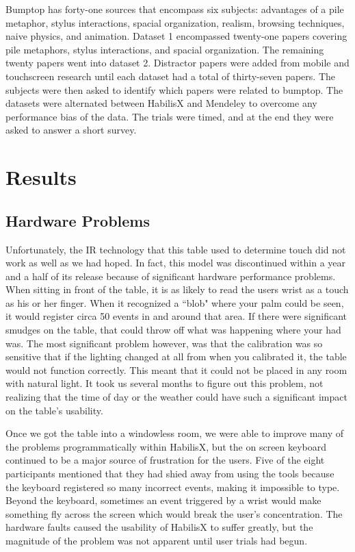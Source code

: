 \documentclass{article}
\begin{document}
	Bumptop has forty-one sources that encompass six subjects: advantages of a pile metaphor, stylus interactions, spacial organization, realism, browsing techniques, naive physics, and animation.  Dataset 1 encompassed twenty-one papers covering pile metaphors, stylus interactions, and spacial organization.  The remaining twenty papers went into dataset 2.  Distractor papers were added from mobile and touchscreen research until each dataset had a total of thirty-seven papers.  The subjects were then asked to identify which papers were related to bumptop.  The datasets were alternated between HabilisX and Mendeley to overcome any performance bias of the data.  The trials were timed, and at the end they were asked to answer a short survey.  
	
\section{Results}
\subsection*{Hardware Problems}
Unfortunately, the IR technology that this table used to determine touch did not work as well as we had hoped.  In fact, this model was discontinued within a year and a half of its release because of significant hardware performance problems.  When sitting in front of the table, it is as likely to read the users wrist as a touch as his or her finger.  When it recognized a ``blob" where your palm could be seen, it would register circa 50 events in and around that area.  If there were significant smudges on the table, that could throw off what was happening where your had was.  The most significant problem however, was that the calibration was so sensitive that if the lighting changed at all from when you calibrated it, the table would not function correctly.  This meant that it could not be placed in any room with natural light.  It took us several months to figure out this problem, not realizing that the time of day or the weather could have such a significant impact on the table's usability.  

Once we got the table into a windowless room, we were able to improve many of the problems programmatically within HabilisX, but the on screen keyboard continued to be a major source of frustration for the users.  Five of the eight participants mentioned that they had shied away from using the tools because the keyboard registered so many incorrect events, making it impossible to type.  Beyond the keyboard, sometimes an event triggered by a wrist would make something fly across the screen which would break the user's concentration.  The hardware faults caused the usability of HabilisX to suffer greatly, but the magnitude of the problem was not apparent until user trials had begun.  
      
\end{document}
